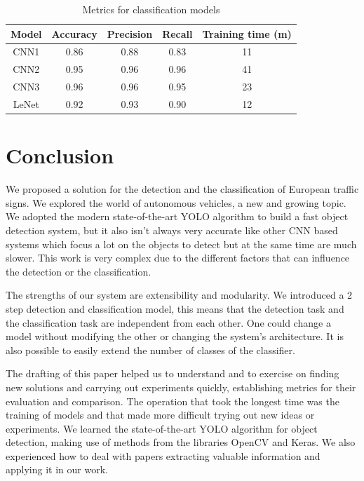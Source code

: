 \documentclass[10pt,twocolumn,letterpaper]{article}
\begin{document}
\begin{table}[h!]
	\begin{center}
		\begin{tabular}{|c|c|c|c|c|}
			\hline
			Model & Accuracy & Precision & Recall & Training time (m) \\
			\hline\hline
			CNN1 & 0.86 & 0.88 & 0.83 & 11 \\
			CNN2 & 0.95 & 0.96 & 0.96 & 41 \\
			CNN3 & 0.96 & 0.96 & 0.95 & 23 \\
			LeNet & 0.92 & 0.93 & 0.90 & 12 \\
			\hline
		\end{tabular}
	\end{center}
	\caption{Metrics for classification models}
	\label{class-metrics}
\end{table}
\section{Conclusion}
We proposed a solution for the detection and the classification of European traffic signs. We explored the world of autonomous vehicles, a new and growing topic. We adopted the modern state-of-the-art YOLO algorithm to build a fast object detection system, but it also isn't always very accurate like other CNN based systems which focus a lot on the objects to detect but at the same time are much slower. This work is very complex due to the different factors that can influence the detection or the classification.

The strengths of our system are extensibility and modularity. We introduced a 2 step detection and classification model, this means that the detection task and the classification task are independent from each other. One could change a model without modifying the other or changing the system's architecture. It is also possible to easily extend the number of classes of the classifier.

The drafting of this paper helped us to understand and to exercise on finding new solutions and carrying out experiments quickly, establishing metrics for their evaluation and comparison. The operation that took the longest time was the training of models and that made more difficult trying out new ideas or experiments. We learned the state-of-the-art YOLO algorithm for object detection, making use of methods from the libraries OpenCV and Keras. We also experienced how to deal with papers extracting valuable information and applying it in our work.
\end{document}
